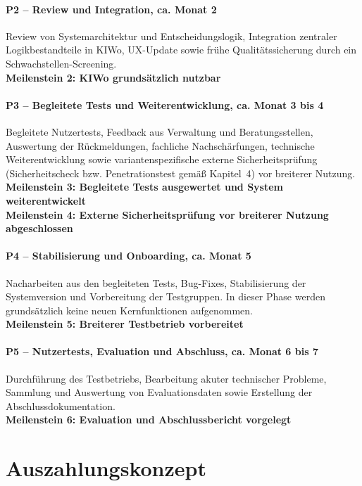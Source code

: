 \documentclass[11pt,a4paper,openany]{report}
\let\origparagraph\paragraph
\renewcommand{\paragraph}[1]{\needspace{4\baselineskip}\origparagraph{#1}}
\begin{document}
\paragraph{P2 -- Review und Integration, ca. Monat 2}
Review von Systemarchitektur und Entscheidungslogik, Integration zentraler
Logikbestandteile in KIWo, UX-Update sowie frühe Qualitätssicherung
durch ein Schwachstellen-Screening.\\
\textbf{Meilenstein 2: KIWo grundsätzlich nutzbar}

\paragraph{P3 -- Begleitete Tests und Weiterentwicklung, ca. Monat 3 bis 4}
Begleitete Nutzertests, Feedback aus Verwaltung und Beratungsstellen,
Auswertung der Rückmeldungen, fachliche Nachschärfungen, technische
Weiterentwicklung sowie variantenspezifische externe Sicherheitsprüfung
(Sicherheitscheck bzw. Penetrationstest gemäß Kapitel~4) vor breiterer
Nutzung.\\
\textbf{Meilenstein 3: Begleitete Tests ausgewertet und System weiterentwickelt}\\
\textbf{Meilenstein 4: Externe Sicherheitsprüfung vor breiterer Nutzung abgeschlossen}

\paragraph{P4 -- Stabilisierung und Onboarding, ca. Monat 5}
Nacharbeiten aus den begleiteten Tests, Bug-Fixes, Stabilisierung der
Systemversion und Vorbereitung der Testgruppen. In dieser Phase werden
grundsätzlich keine neuen Kernfunktionen aufgenommen.\\
\textbf{Meilenstein 5: Breiterer Testbetrieb vorbereitet}

\paragraph{P5 -- Nutzertests, Evaluation und Abschluss, ca. Monat 6 bis 7}
Durchführung des Testbetriebs, Bearbeitung akuter technischer Probleme,
Sammlung und Auswertung von Evaluationsdaten sowie Erstellung der
Abschlussdokumentation.\\
\textbf{Meilenstein 6: Evaluation und Abschlussbericht vorgelegt}

\section{Auszahlungskonzept}
\end{document}
